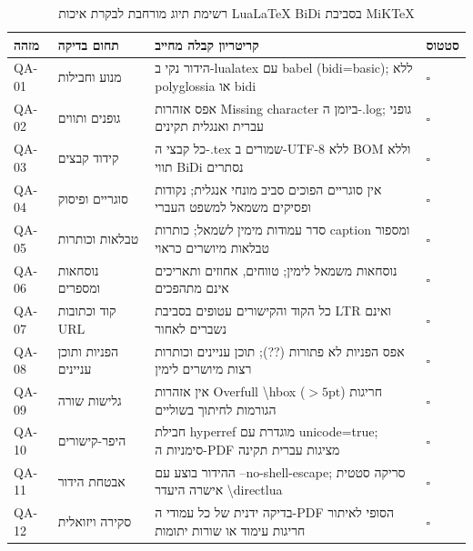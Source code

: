 \begin{table}[htbp]
\centering
\caption{רשימת תיוג מורחבת לבקרת איכות \textenglish{LuaLaTeX BiDi} בסביבת \textenglish{MiKTeX}}
\label{tab:bidi-qa-checklist}
\begin{tabular}{p{1.2cm} p{3.2cm} p{8.4cm} p{1.4cm}}
\toprule
\textbf{מזהה} & \textbf{תחום בדיקה} & \textbf{קריטריון קבלה מחייב} & \textbf{סטטוס} \\
\midrule
\textenglish{QA-01} & מנוע וחבילות & הידור נקי ב-\textenglish{lualatex} עם \textenglish{babel (bidi=basic)}; ללא \textenglish{polyglossia} או \textenglish{bidi} & $\square$ \\
\textenglish{QA-02} & גופנים ותווים & אפס אזהרות \textenglish{Missing character} ביומן ה-\textenglish{.log}; גופני עברית ואנגלית תקינים & $\square$ \\
\textenglish{QA-03} & קידוד קבצים & כל קבצי ה-\textenglish{.tex} שמורים ב-\textenglish{UTF-8} ללא \textenglish{BOM} וללא תווי \textenglish{BiDi} נסתרים & $\square$ \\
\textenglish{QA-04} & סוגריים ופיסוק & אין סוגריים הפוכים סביב מונחי אנגלית; נקודות ופסיקים משמאל למשפט העברי & $\square$ \\
\textenglish{QA-05} & טבלאות וכותרות & סדר עמודות מימין לשמאל; כותרות \textenglish{caption} ומספור טבלאות מיושרים כראוי & $\square$ \\
\textenglish{QA-06} & נוסחאות ומספרים & נוסחאות משמאל לימין; טווחים, אחוזים ותאריכים אינם מתהפכים & $\square$ \\
\textenglish{QA-07} & קוד וכתובות \textenglish{URL} & כל הקוד והקישורים עטופים בסביבת \textenglish{LTR} ואינם נשברים לאחור & $\square$ \\
\textenglish{QA-08} & הפניות ותוכן עניינים & אפס הפניות לא פתורות (\textenglish{??}); תוכן עניינים וכותרות רצות מיושרים לימין & $\square$ \\
\textenglish{QA-09} & גלישות שורה & אין אזהרות \textenglish{Overfull \textbackslash hbox} חריגות ($> 5\text{pt}$) הגורמות לחיתוך בשוליים & $\square$ \\
\textenglish{QA-10} & היפר-קישורים & חבילת \textenglish{hyperref} מוגדרת עם \textenglish{unicode=true}; סימניות ה-\textenglish{PDF} מציגות עברית תקינה & $\square$ \\
\textenglish{QA-11} & אבטחת הידור & ההידור בוצע עם \textenglish{--no-shell-escape}; סריקה סטטית אישרה היעדר \textenglish{\textbackslash directlua} & $\square$ \\
\textenglish{QA-12} & סקירה ויזואלית & בדיקה ידנית של כל עמודי ה-\textenglish{PDF} הסופי לאיתור חריגות עימוד או שורות יתומות & $\square$ \\
\bottomrule
\end{tabular}
\end{table}

